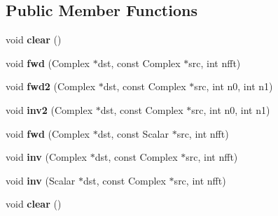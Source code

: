 \subsection*{Public Member Functions}
\begin{DoxyCompactItemize}
\item 
\mbox{\label{struct_eigen_1_1internal_1_1kissfft__impl_a24ae326cc4d2e7b1f5f1e1e15f0df0a9}} 
void {\bfseries clear} ()
\item 
\mbox{\label{struct_eigen_1_1internal_1_1kissfft__impl_ab72085de6e46b34ee777f6f6887afa10}} 
void {\bfseries fwd} (Complex $\ast$dst, const Complex $\ast$src, int nfft)
\item 
\mbox{\label{struct_eigen_1_1internal_1_1kissfft__impl_a6f06e5103fce0687c3f9dada88de7fd7}} 
void {\bfseries fwd2} (Complex $\ast$dst, const Complex $\ast$src, int n0, int n1)
\item 
\mbox{\label{struct_eigen_1_1internal_1_1kissfft__impl_ad8c65a5e75b9059534bf60ded4ace582}} 
void {\bfseries inv2} (Complex $\ast$dst, const Complex $\ast$src, int n0, int n1)
\item 
\mbox{\label{struct_eigen_1_1internal_1_1kissfft__impl_a2e7fc2f0910f00b559b8560e52ce6a4a}} 
void {\bfseries fwd} (Complex $\ast$dst, const Scalar $\ast$src, int nfft)
\item 
\mbox{\label{struct_eigen_1_1internal_1_1kissfft__impl_af6d3bb0a2807a079de677e81f940d41b}} 
void {\bfseries inv} (Complex $\ast$dst, const Complex $\ast$src, int nfft)
\item 
\mbox{\label{struct_eigen_1_1internal_1_1kissfft__impl_a2de77b6da24146144f1d9b202c312108}} 
void {\bfseries inv} (Scalar $\ast$dst, const Complex $\ast$src, int nfft)
\item 
\mbox{\label{struct_eigen_1_1internal_1_1kissfft__impl_a24ae326cc4d2e7b1f5f1e1e15f0df0a9}} 
void {\bfseries clear} ()

\end{DoxyCompactItemize}
